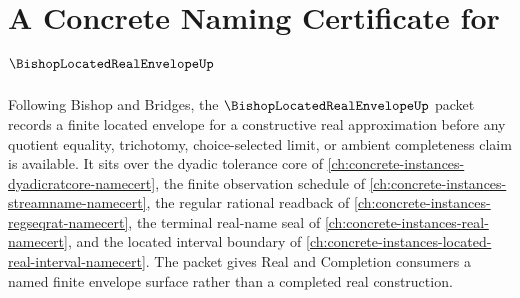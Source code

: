 \chapter{A Concrete Naming Certificate for $\BishopLocatedRealEnvelopeUp$}
\label{ch:concrete-instances-bishop-located-real-envelope-namecert}

Following Bishop and Bridges, the $\BishopLocatedRealEnvelopeUp$ packet records a finite located envelope for a constructive real approximation before any quotient equality, trichotomy, choice-selected limit, or ambient completeness claim is available. It sits over the dyadic tolerance core of \autoref{ch:concrete-instances-dyadicratcore-namecert}, the finite observation schedule of \autoref{ch:concrete-instances-streamname-namecert}, the regular rational readback of \autoref{ch:concrete-instances-regseqrat-namecert}, the terminal real-name seal of \autoref{ch:concrete-instances-real-namecert}, and the located interval boundary of \autoref{ch:concrete-instances-located-real-interval-namecert}. The packet gives Real and Completion consumers a named finite envelope surface rather than a completed real construction.

